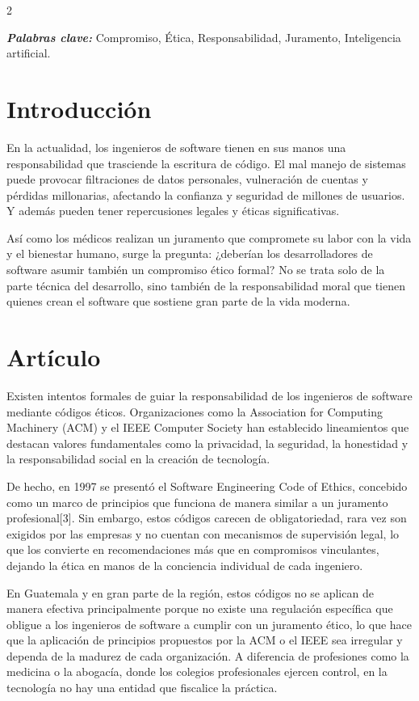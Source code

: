 \documentclass[12pt,spanish,Letterpaper,openany]{book}
\begin{document}
\begin {multicols}{2}

\textbf{\emph{Palabras clave:}} Compromiso, Ética, Responsabilidad, Juramento, Inteligencia artificial.

\section{Introducción}\label{introducciuxf3n-9}

En la actualidad, los ingenieros de software tienen en sus manos una responsabilidad que trasciende la escritura de código. El mal manejo de sistemas puede provocar filtraciones de datos personales, vulneración de cuentas y pérdidas millonarias, afectando la confianza y seguridad de millones de usuarios. Y además pueden tener repercusiones legales y éticas significativas.

Así como los médicos realizan un juramento que compromete su labor con la vida y el bienestar humano, surge la pregunta: ¿deberían los desarrolladores de software asumir también un compromiso ético formal? No se trata solo de la parte técnica del desarrollo, sino también de la responsabilidad moral que tienen quienes crean el software que sostiene gran parte de la vida moderna.

\section{Artículo}\label{artuxedculo-9}

\bigskip

Existen intentos formales de guiar la responsabilidad de los ingenieros de software mediante códigos éticos. Organizaciones como la Association for Computing Machinery (ACM) y el IEEE Computer Society han establecido lineamientos que destacan valores fundamentales como la privacidad, la seguridad, la honestidad y la responsabilidad social en la creación de tecnología.

De hecho, en 1997 se presentó el Software Engineering Code of Ethics, concebido como un marco de principios que funciona de manera similar a un juramento profesional{[}3{]}. Sin embargo, estos códigos carecen de obligatoriedad, rara vez son exigidos por las empresas y no cuentan con mecanismos de supervisión legal, lo que los convierte en recomendaciones más que en compromisos vinculantes, dejando la ética en manos de la conciencia individual de cada ingeniero.

En Guatemala y en gran parte de la región, estos códigos no se aplican de manera efectiva principalmente porque no existe una regulación específica que obligue a los ingenieros de software a cumplir con un juramento ético, lo que hace que la aplicación de principios propuestos por la ACM o el IEEE sea irregular y dependa de la madurez de cada organización. A diferencia de profesiones como la medicina o la abogacía, donde los colegios profesionales ejercen control, en la tecnología no hay una entidad que fiscalice la práctica.


\end{multicols}
\end{document}
